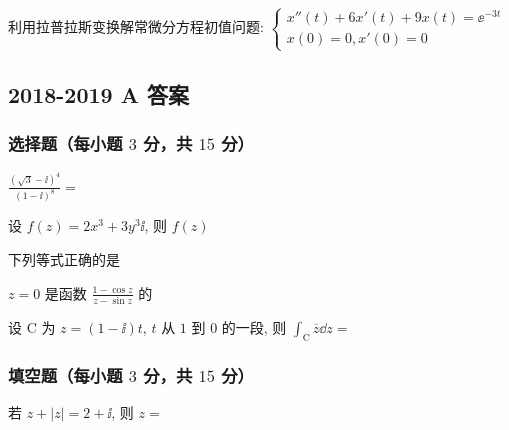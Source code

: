 \begin{ti}[$10$ 分]
	利用拉普拉斯变换解常微分方程初值问题: $\begin{cases}
		x''(t)+6x'(t)+9x(t)=\ee^{-3t}\\
		x(0)=0, x'(0)=0
	\end{cases}$
\end{ti}

\subsection{2018-2019 A 答案}
\subsubsection{选择题（每小题 $3$ 分，共 $15$ 分）}
\begin{ti}
	$\frac{(\sqrt{3}-\ii)^{4}}{(1-\ii)^{8}}=$ \kuoD{}
\end{ti}

\begin{ti}
	设 $f(z)=2 x^{3}+3 y^{3} \ii$, 则 $f(z)$ \kuoB{}
\end{ti}

\begin{ti}
	下列等式正确的是 \kuoC{}
\end{ti}

\begin{ti}
	$z=0$ 是函数 $\frac{1-\cos z}{z-\sin z}$ 的 \kuoD{}
\end{ti}

\begin{ti}
	设 $\mathrm{C}$ 为 $z=(1-\ii)t$, $t$ 从 $1$ 到 $0$ 的一段, 则 $\int_{\mathrm{C}} \overline{z} \dd z=$ \kuoA{}
\end{ti}

\subsubsection{填空题（每小题 $3$ 分，共 $15$ 分）}
\begin{ti}
	若 $z+|z|=2+\ii$, 则 $z=$ 
\end{ti}

